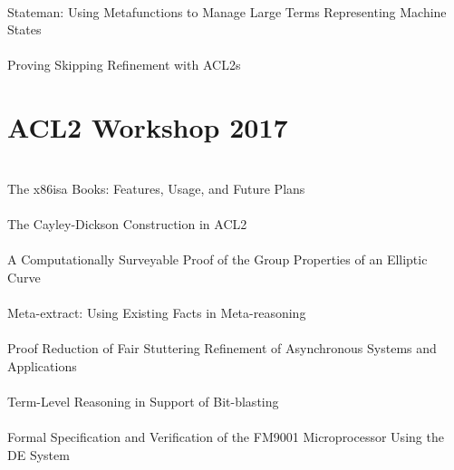 \documentclass{article}
\begin{document}
\cite{15-moore-stateman} \\
{Stateman}: Using Metafunctions to Manage Large Terms Representing Machine States \\

\cite{15-jain-refinement} \\
Proving Skipping Refinement with {ACL2s} \\


\section{ACL2 Workshop 2017}

\cite{17-goel-x86isa} \\
The {x86isa} Books: Features, Usage, and Future Plans \\

\cite{17-cowles-construction} \\
The {Cayley-Dickson} Construction in {ACL2} \\

\cite{17-russinoff-surveyable} \\
A Computationally Surveyable Proof of the Group Properties of an Elliptic Curve \\

\cite{17-kaufmann-meta} \\
Meta-extract: Using Existing Facts in Meta-reasoning \\

\cite{17-sumners-refinement} \\
Proof Reduction of Fair Stuttering Refinement of Asynchronous Systems and Applications \\

\cite{17-swords-blasting} \\
Term-Level Reasoning in Support of Bit-blasting \\

\cite{17-chau-de} \\
Formal Specification and Verification of the {FM9001} Microprocessor Using the {DE} System \\




\end{document}
